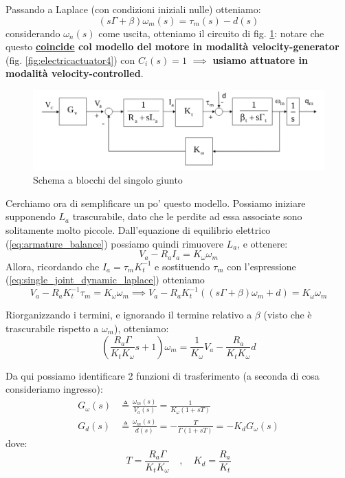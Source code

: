 Passando a Laplace (con condizioni iniziali nulle) otteniamo:
\begin{equation}\label{eq:single_joint_dynamic_laplace}
(s\Gamma + \beta) \omega_m(s) = \tau_m(s) - d(s)
\end{equation}
considerando $\omega_n(s)$ come uscita, otteniamo il circuito di fig. \ref{fig:decentralizedjointspacecontrol3}: notare che questo \textbf{\underline{coincide} col modello del motore in modalità velocity-generator} (fig. \ref{fig:electricactuator4}) con $C_i(s) = 1$ $\implies$ \textbf{usiamo attuatore in modalità velocity-controlled}.

\begin{figure}[th!]
	\centering
	\includegraphics[width=0.7\linewidth]{images/decentralized_joint_space_control_3}
	\caption{Schema a blocchi del singolo giunto}
	\label{fig:decentralizedjointspacecontrol3}
\end{figure}


Cerchiamo ora di semplificare un po' questo modello. Possiamo iniziare supponendo $L_a$ trascurabile, dato che le perdite ad essa associate sono solitamente molto piccole.
Dall'equazione di equilibrio elettrico (\ref{eq:armature_balance}) possiamo quindi rimuovere $L_a$, e ottenere:
\begin{equation}\label{eq:simplified_armature_electrical_balance}
V_a - R_aI_a = K_\omega \omega_m
\end{equation}
Allora, ricordando che $I_a = \tau_m K_t^{-1}$ e sostituendo $\tau_m$ con l'espressione (\ref{eq:single_joint_dynamic_laplace}) otteniamo 
$$
V_a - R_a K_t^{-1} \tau_m = K_\omega \omega_m
\implies
V_a - R_a K_t^{-1} ((s\Gamma + \beta)\omega_m + d)
= K_\omega \omega_m
$$



Riorganizzando i termini, e ignorando il termine relativo a $\beta$ (visto che è trascurabile rispetto a $\omega_m$), otteniamo:
$$
\left( \frac{R_a \Gamma}{K_t K_\omega}s + 1 \right) \omega_m =
\frac{1}{K_\omega}V_a - \frac{R_a}{K_tK_\omega}d
$$

Da qui possiamo identificare 2 funzioni di trasferimento (a seconda di cosa consideriamo ingresso):
\begin{align}
G_\omega(s) &\triangleq \frac{\omega_m(s)}{V_a(s)} = \frac{1}{K_\omega(1 + sT)} \label{eq:tf_omega} \\
G_d(s) &\triangleq \frac{\omega_m(s)}{d(s)} = -\frac{T}{\Gamma(1 + sT)} = -K_dG_\omega(s)
\end{align}
dove:
$$
T = \frac{R_a \Gamma}{K_t K_\omega} 
\quad , \quad
K_d = \frac{R_a}{K_t}
$$

